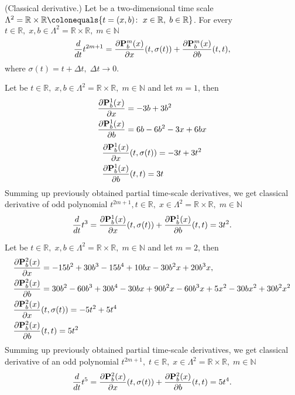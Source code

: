 \begin{cor}
    \label{derivative_case}
    (Classical derivative.)
    Let be a two-dimensional time scale
    $\Lambda^2 = \mathbb{R} \times \mathbb{R} \colonequals \{t=(x, b) \colon \; x\in \mathbb{R}, \; b\in\mathbb{R} \}$.
    For every $t\in\mathbb{R}, \; x,b\in \Lambda^2 = \mathbb{R} \times \mathbb{R}, \; m\in\mathbb{N}$
    \[
        \derivative{t^{2m+1}}{t}
        = \pderivative{\polynomialP{m}{b}{x}}{x}(t, \sigma(t))
        + \pderivative{\polynomialP{m}{b}{x}}{b}(t, t),
    \]
    where $\sigma(t) = t + \Delta t, \; \Delta t \to 0.$
\end{cor}
\begin{examp}
    Let be $t\in\mathbb{R}, \; x,b\in \Lambda^2 = \mathbb{R} \times \mathbb{R}, \; m\in\mathbb{N}$ and let $m=1$, then
    \begin{align*}
        \pderivative{\polynomialP{1}{b}{x}}{x} &= -3 b + 3 b^2 \\
        \pderivative{\polynomialP{1}{b}{x}}{b} &= 6 b - 6 b^2 - 3 x + 6 b x
    \end{align*}
    \begin{align*}
        &\pderivative{\polynomialP{1}{b}{x}}{x}(t, \sigma(t)) = -3t + 3t^2 \\
        &\pderivative{\polynomialP{1}{b}{x}}{b} (t, t) = 3t
    \end{align*}
    Summing up previously obtained partial time-scale derivatives, we get classical derivative of odd polynomial
    $t^{2m+1}, t\in\mathbb{R}, \; x\in \Lambda^2 = \mathbb{R} \times \mathbb{R}, \; m\in\mathbb{N}$
    \[
        \derivative{t^3}{t}
        = \pderivative{\polynomialP{1}{b}{x}}{x}(t, \sigma(t)) + \pderivative{\polynomialP{1}{b}{x}}{b}(t, t)
        = 3t^2.
    \]
\end{examp}
\begin{examp}
    Let be $t\in\mathbb{R}, \; x,b\in \Lambda^2 = \mathbb{R} \times \mathbb{R}, \; m\in\mathbb{N}$ and let $m=2$, then
    \begin{align*}
        &\pderivative{\polynomialP{2}{b}{x}}{x} = -15 b^2 + 30 b^3 - 15 b^4 + 10 b x - 30 b^2 x + 20 b^3 x, \\
        &\pderivative{\polynomialP{2}{b}{x}}{b} = 30 b^2 - 60 b^3 + 30 b^4 - 30 b x + 90 b^2 x - 60 b^3 x + 5 x^2 - 30 b x^2
        + 30 b^2 x^2 \\
        &\pderivative{\polynomialP{2}{b}{x}}{x}(t, \sigma(t)) = -5 t^2 + 5 t^4 \\
        &\pderivative{\polynomialP{2}{b}{x}}{b} (t, t) = 5 t^2
    \end{align*}
    Summing up previously obtained partial time-scale derivatives, we get classical derivative of an odd polynomial
    $t^{2m+1}, \; t\in\mathbb{R}, \; x\in \Lambda^2 = \mathbb{R} \times \mathbb{R}, \; m\in\mathbb{N}$
    \[
        \derivative{t^5}{t}
        = \pderivative{\polynomialP{2}{b}{x}}{x}(t, \sigma(t)) + \pderivative{\polynomialP{2}{b}{x}}{b}(t, t)
        = 5t^4.
    \]
\end{examp}